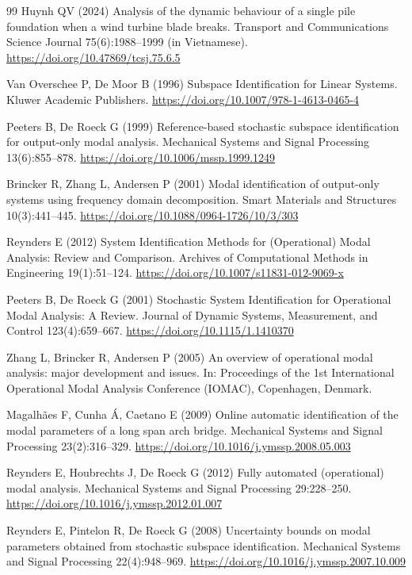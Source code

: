 \documentclass[11pt]{article}
\begin{document}
\begin{thebibliography}{99}
Huynh QV (2024) Analysis of the dynamic behaviour of a single pile foundation when a wind turbine blade breaks. Transport and Communications Science Journal 75(6):1988--1999 (in Vietnamese). \url{https://doi.org/10.47869/tcsj.75.6.5}

Van Overschee P, De Moor B (1996) Subspace Identification for Linear Systems. Kluwer Academic Publishers. \url{https://doi.org/10.1007/978-1-4613-0465-4}

Peeters B, De Roeck G (1999) Reference-based stochastic subspace identification for output-only modal analysis. Mechanical Systems and Signal Processing 13(6):855--878. \url{https://doi.org/10.1006/mssp.1999.1249}

Brincker R, Zhang L, Andersen P (2001) Modal identification of output-only systems using frequency domain decomposition. Smart Materials and Structures 10(3):441--445. \url{https://doi.org/10.1088/0964-1726/10/3/303}

Reynders E (2012) System Identification Methods for (Operational) Modal Analysis: Review and Comparison. Archives of Computational Methods in Engineering 19(1):51--124. \url{https://doi.org/10.1007/s11831-012-9069-x}

Peeters B, De Roeck G (2001) Stochastic System Identification for Operational Modal Analysis: A Review. Journal of Dynamic Systems, Measurement, and Control 123(4):659--667. \url{https://doi.org/10.1115/1.1410370}

Zhang L, Brincker R, Andersen P (2005) An overview of operational modal analysis: major development and issues. In: Proceedings of the 1st International Operational Modal Analysis Conference (IOMAC), Copenhagen, Denmark.

Magalh{\~a}es F, Cunha {\'A}, Caetano E (2009) Online automatic identification of the modal parameters of a long span arch bridge. Mechanical Systems and Signal Processing 23(2):316--329. \url{https://doi.org/10.1016/j.ymssp.2008.05.003}

Reynders E, Houbrechts J, De Roeck G (2012) Fully automated (operational) modal analysis. Mechanical Systems and Signal Processing 29:228--250. \url{https://doi.org/10.1016/j.ymssp.2012.01.007}

Reynders E, Pintelon R, De Roeck G (2008) Uncertainty bounds on modal parameters obtained from stochastic subspace identification. Mechanical Systems and Signal Processing 22(4):948--969. \url{https://doi.org/10.1016/j.ymssp.2007.10.009}


\end{thebibliography}
\end{document}
